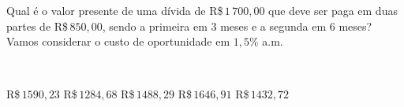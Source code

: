 \parbox{\linewidth}{

Qual é o valor presente de uma dívida de R\$\,$1\,700{,}00$ que deve ser paga em duas partes de R\$\,$850{,}00$, sendo a primeira em $3$ meses e a segunda em $6$ meses? Vamos considerar o custo de oportunidade em $1{,}5\%$ a.m.}\vspace{2mm}\\\parbox{\linewidth}{

R\$\,$   1590{,}23$
R\$\,$   1284{,}68$
R\$\,$   1488{,}29$
R\$\,$   1646{,}91$
R\$\,$   1432{,}72$

}

